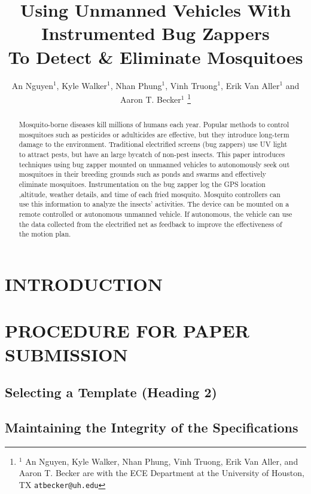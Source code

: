\documentclass[letterpaper, 10 pt, conference]{ieeeconf}  %
\title{\LARGE \bf
Using Unmanned Vehicles With Instrumented Bug Zappers\\ To Detect \& Eliminate Mosquitoes
}
\author{An Nguyen$^{1}$, Kyle Walker$^{1}$, Nhan Phung$^{1}$, Vinh Truong$^{1}$, Erik Van Aller$^{1}$ and Aaron T. Becker$^{1}$%
\thanks{$^{1}$ An Nguyen, Kyle Walker, Nhan Phung, Vinh Truong, Erik Van Aller, and Aaron T. Becker are with the ECE Department at the University of Houston, TX
        {\tt\small atbecker@uh.edu}}%
}
\begin{document}
\maketitle
\thispagestyle{empty}
\pagestyle{empty}


\begin{abstract}

Mosquito-borne diseases kill millions of humans each year. Popular methods to control mosquitoes such as pesticides or adulticides are effective, but they introduce long-term damage to the environment. Traditional electrified screens (bug zappers) use UV light to attract pests, but have an large bycatch of non-pest insects. This paper introduces techniques using bug zapper mounted on unmanned vehicles to autonomously seek out mosquitoes in their breeding grounds such as ponds and swarms and effectively eliminate mosquitoes. Instrumentation on the bug zapper log the GPS location ,altitude,  weather details, and time of each fried mosquito. Mosquito controllers can use this information to analyze the insects' activities. The device can be mounted on a remote controlled or autonomous unmanned vehicle. If autonomous, the vehicle can use the data collected from the electrified net as feedback to improve the effectiveness of the motion plan. 
\end{abstract}


\section{INTRODUCTION}



\section{PROCEDURE FOR PAPER SUBMISSION}

\subsection{Selecting a Template (Heading 2)}


\subsection{Maintaining the Integrity of the Specifications}
\end{document}
